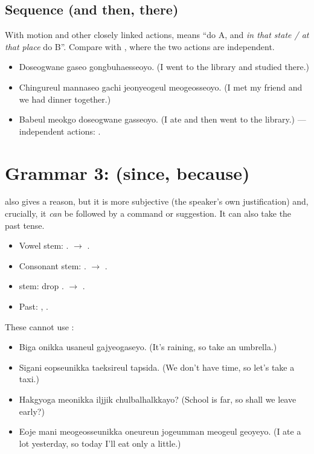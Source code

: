 \subsection{Sequence (and then, there)}

With motion and other closely linked actions,  means ``do A, and
\emph{in that state / at that place} do B''. Compare with , where the two
actions are independent.
\begin{itemize}
  \item {} Doseogwane gaseo gongbuhaesseoyo. (I went to the
        library and studied there.)
  \item {} Chingureul mannaseo gachi jeonyeogeul
        meogeosseoyo. (I met my friend and we had dinner together.)
  \item {} Babeul meokgo doseogwane gasseoyo. (I ate and
        then went to the library.) --- independent actions: .
\end{itemize}

\section{Grammar 3:  (since, because)}

 also gives a reason, but it is more subjective (the speaker's own
justification) and, crucially, it \emph{can} be followed by a command or suggestion. It
can also take the past tense.

\begin{itemize}
  \item Vowel stem: .  $\to$ .
  \item Consonant stem: .  $\to$ .
  \item {} stem: drop .  $\to$ .
  \item Past: , .
\end{itemize}

\begin{example}
These cannot use :
\begin{itemize}
  \item {} Biga onikka usaneul gajyeogaseyo. (It's
        raining, so take an umbrella.)
  \item {} Sigani eopseunikka taeksireul tapsida. (We
        don't have time, so let's take a taxi.)
  \item {} Hakgyoga meonikka iljjik chulbalhalkkayo?
        (School is far, so shall we leave early?)
  \item {} Eoje mani meogeosseunikka
        oneureun jogeumman meogeul geoyeyo. (I ate a lot yesterday, so today I'll eat
        only a little.)
\end{itemize}
\end{example}

